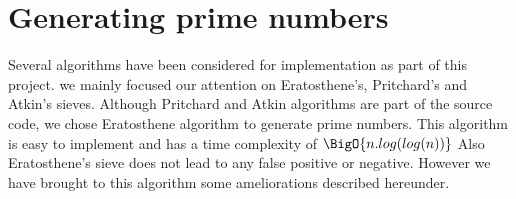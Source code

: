 \newpage\cleardoublepage{}
\section{Generating prime numbers}

Several algorithms have been considered for implementation as part of this project. we mainly focused our attention on Eratosthene's, Pritchard's and Atkin's sieves. Although Pritchard and Atkin algorithms are part of the source code, we chose Eratosthene algorithm to generate prime numbers. This algorithm is easy to implement and has a time complexity of $\BigO{n.log(log (n))}$ Also Eratosthene's sieve does not lead to any false positive or negative. However we have brought to this algorithm some ameliorations described hereunder.